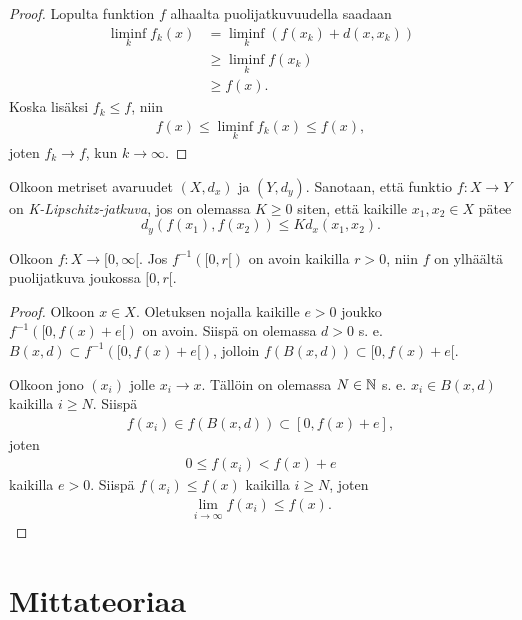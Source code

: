 \documentclass[12pt,oneside,a4paper]{amsbook} %
\begin{document}
\begin{proof}
    Lopulta funktion $f$ alhaalta puolijatkuvuudella saadaan
    \begin{align*}
        \liminf_k f_k(x) &= \liminf_k (f(x_k) + d(x,x_k)) \\
        &\ge \liminf_k f(x_k) \\
        & \ge f(x).
    \end{align*}
    Koska lisäksi $f_k \le f$, niin
    \begin{align*}
        f(x) \le \liminf_k f_k(x) \le f(x),
    \end{align*}
    joten $f_k \to f$, kun $k \to \infty$.
\end{proof}

\begin{definition}
    Olkoon metriset avaruudet $(X, d_x)$ ja $(Y, d_y)$. Sanotaan, että funktio  ${f:X\to Y}$ on \textit{K-Lipschitz-jatkuva}, jos on olemassa $K\ge 0$ siten, että kaikille $x_1,x_2 \in X$ pätee
    $$d_y(f(x_1),f(x_2)) \le Kd_x(x_1,x_2).$$
\end{definition}

\begin{lemma}\label{le:openPreimageImpliesUSC}
    Olkoon $f:X \to [0, \infty[$. Jos $f^{-1}([0, r[)$ on avoin kaikilla $r > 0$, niin $f$ on ylhäältä puolijatkuva joukossa $[0, r[$.
\end{lemma}
\begin{proof}
    Olkoon $x \in X$. Oletuksen nojalla kaikille $e > 0$ joukko $f^{-1}([0, f(x) + e[)$ on avoin. Siispä on olemassa $d > 0$ s. e. $B(x, d) \subset f^{-1}([0, f(x) + e[)$, jolloin $f(B(x,d)) \subset [0, f(x) + e[$.
    
    Olkoon jono $(x_i)$ jolle $x_i \to x$. Tällöin on olemassa $N \in \mathbb{N}$ s. e. $x_i \in B(x, d)$ kaikilla $i \ge N$. Siispä
    \begin{align*}
        f(x_i) \in f(B(x, d)) \subset [0, f(x) + e],
    \end{align*}
    joten
    \begin{align*}
        0 \le f(x_i) < f(x) + e
    \end{align*}
    kaikilla $e > 0$. Siispä $f(x_i) \le f(x)$ kaikilla $i \ge N$, joten
    \begin{align*}
        \lim_{i\to \infty}f(x_i) \le f(x).
    \end{align*}
\end{proof}


\section{Mittateoriaa}
\end{document}
